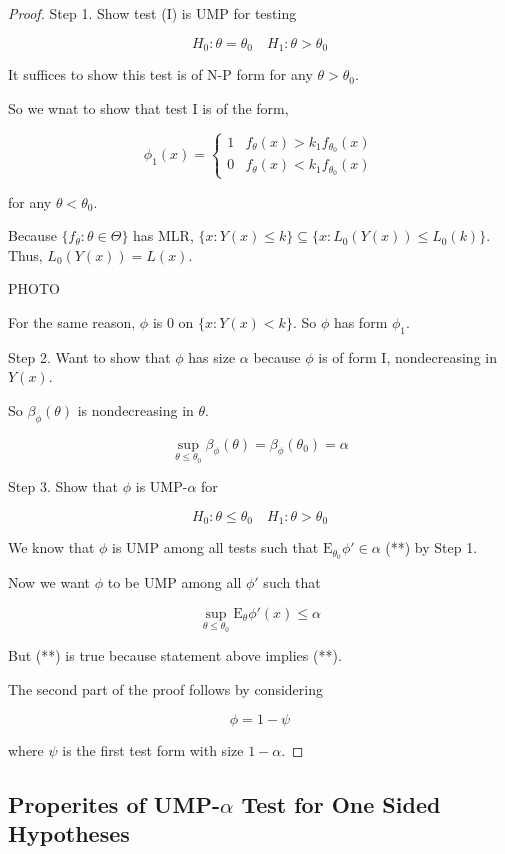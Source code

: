 \documentclass[11pt,fleqn]{book} %
\newcommand{\E}{\mathrm{E}}
\begin{document}
 \begin{proof}
 	Step 1. Show test (I) is UMP for testing

 			$$H_0: \theta = \theta_0 \quad H_1: \theta > \theta_0 $$

 	It suffices to show this test is of N-P form for any $\theta > \theta_0$. 

 	So we wnat to show that test I is of the form, 


 		$$\phi_1(x) = \left\{ \begin{array}{ll}
 					1 & f_\theta(x) > k_1 f_{\theta_0} (x)\\
 					0 & f_\theta(x) < k_1 f_{\theta_0} (x)
 				\end{array}\right.$$

 for any $\theta < \theta_0$. 

 Because $\{f_\theta: \theta \in \Theta\}$ has MLR, $\{x: Y(x) \leq k\} \subseteq \{x: L_0(Y(x)) \leq L_0(k)\}$. Thus, $L_0(Y(x)) = L(x)$. 

 PHOTO

 For the same reason, $\phi$ is 0 on $\{x: Y(x) < k\}$. So $\phi$ has form $\phi_1$. 

 Step 2. Want to show that $\phi$ has size $\alpha$ because $\phi$ is of form I, nondecreasing in $Y(x)$. 

 So $\beta_\phi(\theta)$ is nondecreasing in $\theta$. 

 		$$\sup_{\theta \leq \theta_0} \beta_\phi (\theta) = \beta_\phi(\theta_0) = \alpha $$


 Step 3. Show that $\phi$ is UMP-$\alpha$ for 

 		$$H_0: \theta \leq \theta_0 \quad H_1: \theta > \theta_0 $$

 We know that $\phi $ is UMP among all tests such that $\E_{\theta_0} \phi' \in \alpha$ (**) by Step 1. 

 Now we want $\phi$ to be UMP among all $\phi'$ such that 

 		$$\sup_{\theta \leq \theta_0} \E_\theta \phi'(x) \leq \alpha $$

 But (**) is true because statement above implies (**). 

 The second part of the proof follows by considering 

 			$$\phi = 1 - \psi $$

 where $\psi$ is the first test form with size $1 - \alpha$. 

 \end{proof}

 \subsection{Properites of UMP-$\alpha$ Test for One Sided Hypotheses}
\end{document}
